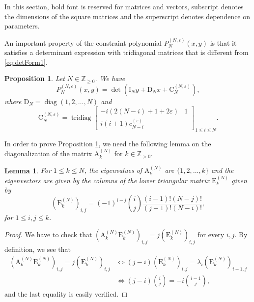 \documentclass[11pt]{article}
\numberwithin{equation}{section}
\newcommand{\Z}{\mathbb{Z}} %
\newcommand{\e}{\varepsilon}
\newcommand{\cp}[2]{P^{(#1)}_{#2}} %
\DeclareMathOperator{\diag}{diag}
\DeclareMathOperator{\tridiag}{tridiag}
\newcommand{\Tridiag}[4]{\tridiag\mat{#1 & #2 \\ #3}_{#4}}
\newcommand{\mat}[1]{\begin{bmatrix}#1\end{bmatrix}}
\newcommand{\MatSymbol}[1]{\bm{\mathrm{#1}}}
\newcommand{\mA}{\MatSymbol{A}}
\newcommand{\mC}{\MatSymbol{C}}
\newcommand{\mD}{\MatSymbol{D}}
\newcommand{\mE}{\MatSymbol{E}}
\newcommand{\mI}{\MatSymbol{I}}
\theoremstyle{plain}
\newtheorem{lem}[thm]{Lemma}
\newtheorem{prop}[thm]{Proposition}
\theoremstyle{definition}
\theoremstyle{remark}
\begin{document}
In this section, bold font is reserved for matrices and vectors, subscript denotes the dimensions
of the square matrices and the superscript denotes dependence on parameters.

An important property of the constraint polynomial \(\cp{N,\e}{N}(x,y)\) is that it satisfies a determinant
expression with tridiagonal matrices that is different from \eqref{eq:detForm1}.

\begin{prop}
  \label{prop:detexp}
  Let \( N \in \Z_{\geq 0}\). We have
  \[
    \cp{N,\e}{N}(x,y) = \det\left( \mI_N y + \mD_N x + \mC_N^{(N,\e)} \right),
  \]
  where $\mD_N=\diag(1,2,\dots,N)$
and
\begin{equation*}
\mC^{(N,\e)}_N=\Tridiag{-i(2(N-i)+1+2\e)}{1}{i(i+1)c^{(\e)}_{N-i}}{1\le i\le N}.
\end{equation*}
\end{prop}

In order to prove Proposition \ref{prop:detexp}, we need the following lemma on the diagonalization
of the matrix \(\mA^{(N)}_k\) for \(k \in \Z_{> 0}\).

\begin{lem}
  \label{lem:eigenA}
  For \(1 \leq k \leq N\), the eigenvalues of \(\mA^{(N)}_k\) are \(\{1,2,\ldots,k\}\) and
  the eigenvectors are given by the columns of the lower triangular matrix \( \mE^{(N)}_k \)
  given by
  \[
    (\mE^{(N)}_k)_{i,j} = (-1)^{i-j}\binom ij\frac{(i-1)!(N-j)!}{(j-1)!(N-i)!},
  \]
  for \( 1 \leq i,j \leq k \).
\end{lem}

\begin{proof}
  We have to check that $(\mA^{(N)}_k\mE^{(N)}_k)_{i,j}=j(\mE^{(N)}_k)_{i,j}$ for every $i,j$.
  By definition, we see that
  \begin{align*}
  (\mA^{(N)}_k\mE^{(N)}_k)_{i,j}=j(\mE^{(N)}_k)_{i,j}
  &\iff (j-i)(\mE^{(N)}_k)_{i,j}=\lambda_i(\mE^{(N)}_k)_{i-1,j} \\
  &\iff (j-i)\binom ij=-i\binom{i-1}j,
  \end{align*}
  and the last equality is easily verified. 
\end{proof}
\end{document}

